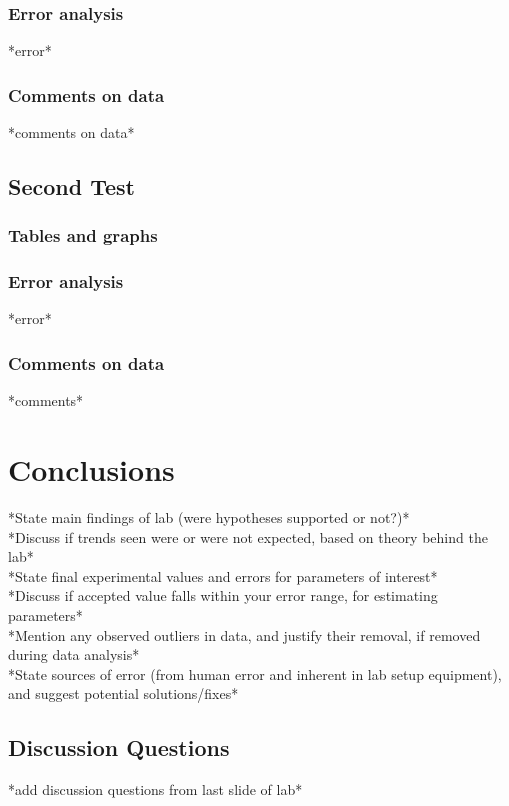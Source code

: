 \documentclass[
	letterpaper, %
	10pt, %
]{CSUniSchoolLabReport}
\begin{document}
\subsubsection{Error analysis}
*error*

\subsubsection{Comments on data}
*comments on data*

\subsection{Second Test}
\subsubsection{Tables and graphs}



\subsubsection{Error analysis}
*error*
\subsubsection{Comments on data}
*comments*

\section{Conclusions}
*State main findings of lab (were hypotheses supported or not?)*\\
*Discuss if trends seen were or were not expected, based on theory behind the lab*\\
*State final experimental values and errors for parameters of interest*\\
*Discuss if accepted value falls within your error range, for estimating parameters*\\
*Mention any observed outliers in data, and justify their removal, if removed during data
analysis*\\
*State sources of error (from human error and inherent in lab setup equipment), and
suggest potential solutions/fixes*

\subsection{Discussion Questions}
*add discussion questions from last slide of lab*
\end{document}
